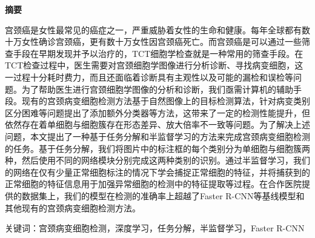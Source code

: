 \cleardoublepage{}
\begin{center}
    \bfseries {} 摘要
\end{center}

\par 宫颈癌是女性最常见的癌症之一，严重威胁着女性的生命和健康。每年全球都有数十万女性确诊宫颈癌，更有数十万女性因宫颈癌死亡。而宫颈癌是可以通过一些筛查手段在早期发现并予以治疗的，TCT细胞学检查就是一种常用的筛查手段。在TCT检查过程中，医生需要对宫颈细胞学图像进行分析诊断、寻找病变细胞，这一过程十分耗时费力，而且还面临着诊断具有主观性以及可能的漏检和误检等问题。为了帮助医生进行宫颈细胞学图像的分析和诊断，我们亟需计算机的辅助手段。现有的宫颈病变细胞检测方法基于自然图像上的目标检测算法，针对病变类别区分困难等问题提出了添加额外分类器等方法，这带来了一定的检测性能提升，但依然存在着单细胞与细胞簇存在形态差异、放大倍率不一致等问题。为了解决上述问题，本文提出了一种基于任务分解和半监督学习的方法来完成宫颈病变细胞检测的任务。基于任务分解，我们将图片中的标注框的每个类别分为单细胞与细胞簇两种，然后使用不同的网络模块分别完成这两种类别的识别。通过半监督学习，我们的网络在仅有少量正常细胞标注的情况下学会捕捉正常细胞的特征，并将捕获到的正常细胞的特征信息用于加强异常细胞的检测中的特征提取等过程。在合作医院提供的数据集上，我们的模型在检测的准确率上超越了Faster R-CNN等基线模型和其他现有的宫颈病变细胞检测方法。
\par 关键词：宫颈病变细胞检测，深度学习，任务分解，半监督学习，Faster R-CNN

